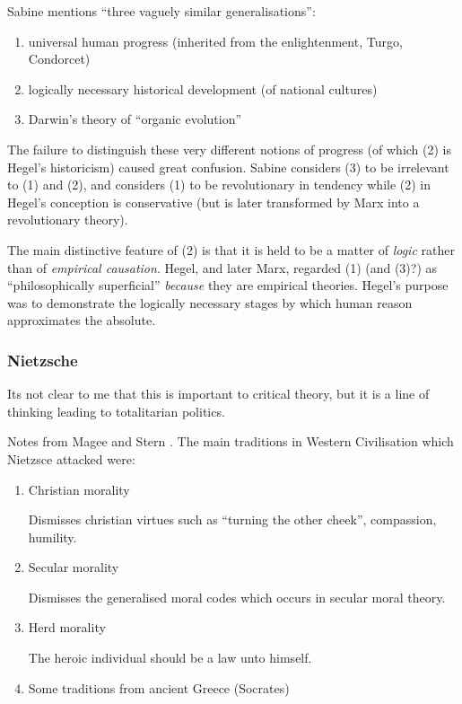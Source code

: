 \documentclass[10pt,titlepage]{book}
\begin{document}
Sabine mentions ``three vaguely similar generalisations'':

\begin{enumerate}
\item universal human progress (inherited from the enlightenment, Turgo, Condorcet)
  
\item logically necessary historical development (of national cultures)
  
\item Darwin's theory of ``organic evolution''
\end{enumerate}

The failure to distinguish these very different notions of progress (of which (2) is Hegel's historicism) caused great confusion.
Sabine considers (3) to be irrelevant to (1) and (2), and considers (1) to be revolutionary in tendency while (2) in Hegel's conception is conservative (but is later transformed by Marx into a revolutionary theory).

The main distinctive feature of (2) is that it is held to be a matter of \emph{logic} rather than of \emph{empirical causation}.
Hegel, and later Marx, regarded (1) (and (3)?) as ``philosophically superficial'' \emph{because} they are empirical theories.
Hegel's purpose was to demonstrate the logically necessary stages by which human reason approximates the absolute.

\subsubsection{Nietzsche}

Its not clear to me that this is important to critical theory, but it is a line of thinking leading to totalitarian politics.

Notes from Magee and Stern \cite{magee-stern}.
The main traditions in Western Civilisation which Nietzsce attacked were:

\begin{enumerate}
  
\item Christian morality

Dismisses christian virtues such as ``turning the other cheek'', compassion, humility.
  
\item Secular morality

Dismisses the generalised moral codes which occurs in secular moral theory.

\item Herd morality

The heroic individual should be a law unto himself.
  
\item Some traditions from ancient Greece (Socrates)
  
\end{enumerate}
\end{document}
